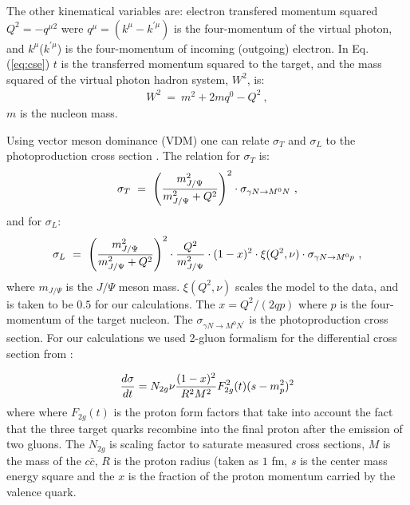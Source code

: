 The other kinematical variables are: electron transfered momentum squared
$Q^2=-q^{\mu 2}$ were $q^\mu=(k^\mu-k^{\prime \mu})$ is the four-momentum 
of the virtual photon, and $k^\mu$($k^{\prime\mu}$) is the 
four-momentum of incoming (outgoing) electron. In Eq.(\ref{eq:cse}) $t$
is the transferred momentum squared to the target, and the mass squared 
of the virtual photon hadron system, $W^2$, is:
\begin{eqnarray}
\label{eq:w}
W^2~=~m^2+2mq^0 - Q^2 \ ,
\end{eqnarray}
$m$ is the nucleon mass.

Using vector meson dominance (VDM) one can relate $\sigma_T$
and $\sigma_L$ to the photoproduction cross section \cite{vdm}.
The relation for $\sigma_T$ is:
\begin{eqnarray}
\label{eq:st}
\sigma_T ~=~  \left( {m_{J/\Psi}^2\over 
m_{J/\Psi}^2+Q^2} \right) ^2\cdot \sigma_{\gamma N \rightarrow M^0N} \ ,
\end{eqnarray}
and for $\sigma_L$:
\begin{eqnarray}
\label{eq:sl}
\sigma_L~=~\left( {m_{J/\Psi}^2\over m_{J/\Psi}^2+Q^2} 
\right) ^2\cdot 
{Q^2\over m_{J/\Psi}^2}\cdot (1-x)^2
\cdot \xi(Q^2,\nu)\cdot \sigma_{\gamma N \rightarrow M^0p} \ ,
\end{eqnarray}
where $m_{J/\Psi}$ is the $J/\Psi$ meson mass. 
$\xi(Q^2,\nu)$ scales the model to the data, and is taken to be $0.5$ for our calculations.  
The $x=Q^2/(2qp)$ where $p$ is the four-momentum of the target nucleon. 
The $\sigma_{\gamma N
\rightarrow M^0N^\prime}$ is the photoproduction cross section. For our calculations we used 2-gluon formalism for the differential cross section from \cite{brodsky:2000zc}:

\begin{eqnarray}
{d\sigma\over {dt}} = N_{2g}\nu{(1-x)^2\over{R^2M^2}}F^2_{2g}(t)(s-m_p^2)^2
\end{eqnarray}
where where $F_{2g}(t)$ is the proton form factors that take into account the fact that the three target quarks recombine into the final proton after the emission of two gluons. The $N_{2g}$ is scaling factor to saturate measured cross sections, $M$ is the mass of the $c\bar c$, $R$ is the proton radius (taken as $1$ fm, $s$ is the center mass energy square and the $x$ is the fraction of the proton momentum carried by the valence quark.  

